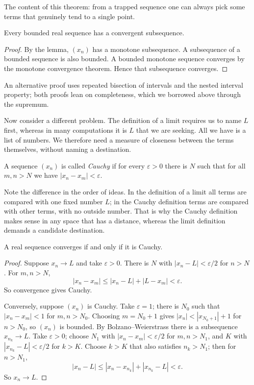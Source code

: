 The content of this theorem: from a trapped sequence one can always pick some terms
that genuinely tend to a single point.

\begin{teorema}
Every bounded real sequence has a convergent subsequence.
\end{teorema}

\begin{proof}
By the lemma, $(x_n)$ has a monotone subsequence. A subsequence of a bounded sequence
is also bounded. A bounded monotone sequence converges by the monotone convergence
theorem. Hence that subsequence converges.
\end{proof}

An alternative proof uses repeated bisection of intervals and the nested interval
property; both proofs lean on completeness, which we borrowed above through the
supremum.


Now consider a different problem. The definition of a limit requires us to name $L$
first, whereas in many computations it is $L$ that we are seeking. All we have is a
list of numbers. We therefore need a measure of closeness between the terms
themselves, without naming a destination.

\begin{definisi}
A sequence $(x_n)$ is called \emph{Cauchy} if for every
$\varepsilon>0$ there is $N$ such that for all $m,n>N$ we have
$|x_n-x_m|<\varepsilon$.
\end{definisi}

Note the difference in the order of ideas. In the definition of a limit all terms are
compared with one fixed number $L$; in the Cauchy definition terms are compared with
other terms, with no outside number. That is why the Cauchy definition makes sense in
any space that has a distance, whereas the limit definition demands a candidate
destination.

\begin{teorema}
A real sequence converges if and only if it is Cauchy.
\end{teorema}

\begin{proof}
Suppose $x_n \to L$ and take $\varepsilon>0$. There is $N$ with
$|x_n-L|<\varepsilon/2$ for $n>N$. For $m,n>N$,
\[
|x_n-x_m| \le |x_n-L| + |L-x_m| < \varepsilon .
\]
So convergence gives Cauchy.

Conversely, suppose $(x_n)$ is Cauchy. Take $\varepsilon=1$; there is $N_0$ such that
$|x_n-x_m|<1$ for $m,n>N_0$. Choosing $m=N_0+1$ gives
$|x_n|<|x_{N_0+1}|+1$ for $n>N_0$, so $(x_n)$ is bounded. By Bolzano--Weierstrass
there is a subsequence $x_{n_k} \to L$. Take $\varepsilon>0$; choose $N_1$ with
$|x_n-x_m|<\varepsilon/2$ for $m,n>N_1$, and $K$ with $|x_{n_k}-L|<\varepsilon/2$ for
$k>K$. Choose $k>K$ that also satisfies $n_k>N_1$; then for $n>N_1$,
\[
|x_n-L| \le |x_n-x_{n_k}| + |x_{n_k}-L| < \varepsilon .
\]
So $x_n \to L$.
\end{proof}


